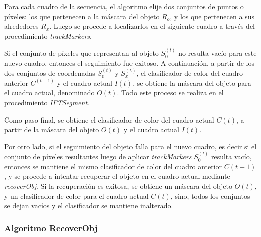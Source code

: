 \documentclass[a4paper,10pt]{article}
\begin{document}
Para cada cuadro de la secuencia, el algoritmo elije dos conjuntos de puntos o píxeles: los que pertenecen a la máscara del objeto $R_{o}$, y los que pertenecen a
sus alrededores $R_{x}$. Luego se procede
a localizarlos en el siguiente cuadro a través del procedimiento \textit{trackMarkers}.

Si el conjunto de píxeles que representan al objeto $S_{0}^{(t)}$ no resulta
vacío para este nuevo cuadro, entonces el seguimiento fue exitoso. A
continuación, a partir de los dos conjuntos de coordenadas $S_{0}^{(t)}$ y
$S_{x}^{(t)}$, el clasificador de color del cuadro anterior $C^{(t-1)}$ y el
cuadro actual $I{(t)}$, se obtiene la máscara del objeto para el cuadro actual,
denominado $O{(t)}$. Todo este proceso se realiza en el procedimiento
\textit{IFTSegment}.

Como paso final, se obtiene el clasificador de color del cuadro actual $C{(t)}$, a partir de la máscara del objeto $O{(t)}$ y el cuadro actual $I{(t)}$.

Por otro lado, si el seguimiento del objeto falla para el nuevo cuadro, es decir si el conjunto de píxeles resultantes luego de aplicar \textit{trackMarkers} $S_{0}^{(t)}$
resulta vacío, entonces se mantiene el mismo clasificador de color del cuadro anterior $C{(t-1)}$, y se procede
a intentar recuperar el objeto en el cuadro actual mediante \textit{recoverObj}. Si la recuperación
es exitosa, se obtiene un máscara del objeto $O{(t)}$, y un clasificador de color para el cuadro actual $C{(t)}$,
sino, todos los conjuntos se dejan vacíos y el clasificador se mantiene inalterado.\

\subsubsection{Algoritmo RecoverObj}
\end{document}
